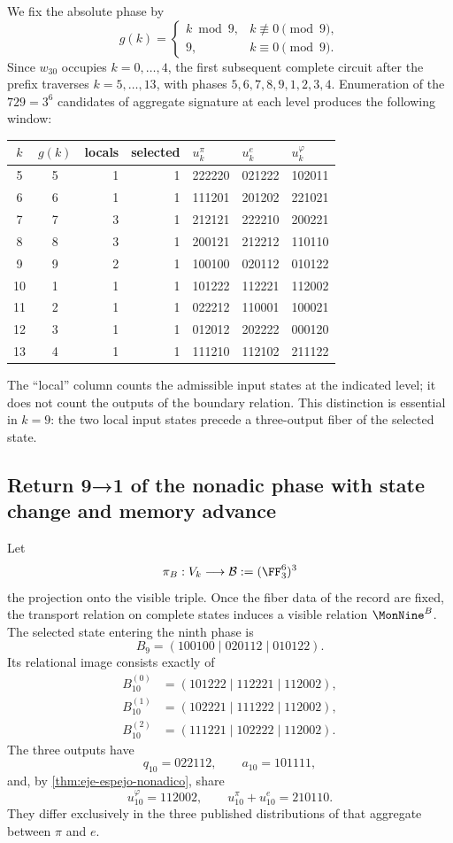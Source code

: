 We fix the absolute phase by
\[
g(k)=
\begin{cases}
k\bmod9,&k\not\equiv0\pmod9,\\
9,&k\equiv0\pmod9.
\end{cases}
\]
Since \(w_{30}\) occupies \(k=0,\ldots,4\), the first subsequent complete circuit
after the prefix traverses \(k=5,\ldots,13\), with phases
\(5,6,7,8,9,1,2,3,4\). Enumeration of the \(729=3^6\) candidates of
aggregate signature at each level produces the following window:
\begin{center}
\small
\begin{tabular}{@{}ccrrlll@{}}
\toprule
\(k\)&\(g(k)\)&locals&selected&\(u_k^\pi\)&\(u_k^e\)&\(u_k^\varphi\)\\
\midrule
5&5&1&1&222220&021222&102011\\
6&6&1&1&111201&201202&221021\\
7&7&3&1&212121&222210&200221\\
8&8&3&1&200121&212212&110110\\
9&9&2&1&100100&020112&010122\\
10&1&1&1&101222&112221&112002\\
11&2&1&1&022212&110001&100021\\
12&3&1&1&012012&202222&000120\\
13&4&1&1&111210&112102&211122\\
\bottomrule
\end{tabular}
\end{center}
The “local” column counts the admissible input states at the indicated
level; it does not count the outputs of the boundary relation. This distinction
is essential in \(k=9\): the two local input states precede a
three-output fiber of the selected state.

\subsection{Return 9→1 of the nonadic phase with state change and memory advance}

Let
\[
 \pi_B:V_k\longrightarrow\mathcal B:=(\FF_3^6)^3
\]
the projection onto the visible triple. Once the fiber data of the record are fixed,
the transport relation on complete states induces a visible
relation \(\MonNine^B\). The selected state entering the ninth phase is
\[
B_9=(100100\mid020112\mid010122).
\]
Its relational image consists exactly of
\[
\begin{aligned}
B_{10}^{(0)}&=(101222\mid112221\mid112002),\\
B_{10}^{(1)}&=(102221\mid111222\mid112002),\\
B_{10}^{(2)}&=(111221\mid102222\mid112002).
\end{aligned}
\]
The three outputs have
\[
q_{10}=022112,
\qquad a_{10}=101111,
\]
and, by \cref{thm:eje-espejo-nonadico}, share
\[
u_{10}^\varphi=112002,
\qquad u_{10}^\pi+u_{10}^e=210110.
\]
They differ exclusively in the three published distributions of that aggregate
between \(\pi\) and \(e\).

